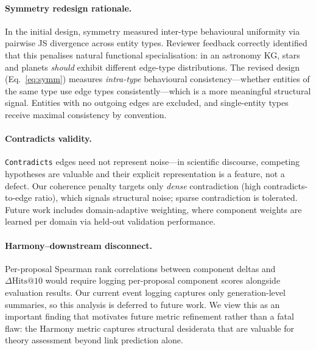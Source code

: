 \paragraph{Symmetry redesign rationale.}
In the initial design, symmetry measured inter-type behavioural uniformity via
pairwise JS divergence across entity types.  Reviewer feedback correctly
identified that this penalises natural functional specialisation: in an
astronomy KG, stars and planets \emph{should} exhibit different edge-type
distributions.  The revised design (Eq.~\ref{eq:symm}) measures \emph{intra-type}
behavioural consistency---whether entities of the same type use edge types
consistently---which is a more meaningful structural signal.  Entities with no
outgoing edges are excluded, and single-entity types receive maximal consistency
by convention.

\paragraph{Contradicts validity.}
\texttt{Contradicts} edges need not represent noise---in scientific discourse,
competing hypotheses are valuable and their explicit representation is a feature,
not a defect.  Our coherence penalty targets only \emph{dense} contradiction
(high contradicts-to-edge ratio), which signals structural noise; sparse
contradiction is tolerated.  Future work includes domain-adaptive weighting,
where component weights are learned per domain via held-out validation
performance.

\paragraph{Harmony--downstream disconnect.}
Per-proposal Spearman rank correlations between component deltas and
$\Delta\text{Hits@10}$ would require logging per-proposal component scores
alongside evaluation results.  Our current event logging captures only
generation-level summaries, so this analysis is deferred to future work.
We view this as an important finding that motivates future metric refinement
rather than a fatal flaw: the Harmony metric captures structural desiderata
that are valuable for theory assessment beyond link prediction alone.

